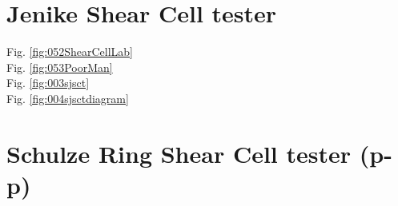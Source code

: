 \section{Jenike Shear Cell tester}
\label{sec:jsct}

Fig. \ref{fig:052ShearCellLab} \\
Fig. \ref{fig:053PoorMan} \\
Fig. \ref{fig:003sjsct} \\

Fig. \ref{fig:004sjsctdiagram} \\


\section{Schulze Ring Shear Cell tester (p-p)}
\label{sec:SRSCT}




